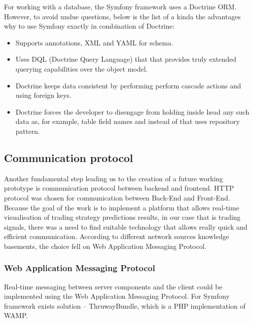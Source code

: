 \documentclass[thesis=B,english]{FITthesis}[2019/03/06]
\begin{document}
For working with a database, the Symfony framework uses a Doctrine ORM.
However, to avoid undue questions, below is the list of a kinda the advantages why to use Symfony exactly in combination of Doctrine:
\begin{itemize}
	\item Supports annotations, XML and YAML for schema.
    \item Uses DQL (Doctrine Query Language) that that provides truly extended querying capabilities over the object model.
    \item Doctrine keeps data consistent by performing perform cascade actions and using foreign keys.
    \item Doctrine forces the developer to disengage from holding inside head any such data as, for example, table field names and instead of that uses repository pattern.
\end{itemize}



\subsection{Communication protocol}
Another fundamental step leading us to the creation of a future working prototype is communication protocol between backend and frontend. HTTP protocol was chosen for communication between Back-End and Front-End. Because the goal of the work is to implement a platform that allows real-time visualisation of trading strategy predictions results, in our case that is trading signals, there was a need to find suitable technology that allows really quick and efficient communication. According to different network sources knowledge basements, the choice fell on  Web Application Messaging Protocol.

\subsubsection{Web Application Messaging Protocol}
Real-time messaging between server components and the client could be implemented using the Web Application Messaging Protocol.  For Symfony framework exists solution --  ThruwayBundle, which is a PHP implementation of WAMP. 
 
\end{document}

